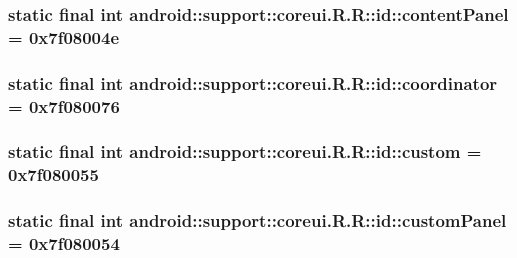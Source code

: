 \hypertarget{classandroid_1_1support_1_1coreui_1_1_r_1_1id_f7466d98502a819103a78bcd6ac69c60}{
\subsubsection[{contentPanel}]{\setlength{\rightskip}{0pt plus 5cm}static final int android::support::coreui.R.R::id::contentPanel = 0x7f08004e}}
\label{classandroid_1_1support_1_1coreui_1_1_r_1_1id_f7466d98502a819103a78bcd6ac69c60}


\hypertarget{classandroid_1_1support_1_1coreui_1_1_r_1_1id_6e4fe4e07570a40cd3118ea9df8ce334}{
\subsubsection[{coordinator}]{\setlength{\rightskip}{0pt plus 5cm}static final int android::support::coreui.R.R::id::coordinator = 0x7f080076}}
\label{classandroid_1_1support_1_1coreui_1_1_r_1_1id_6e4fe4e07570a40cd3118ea9df8ce334}


\hypertarget{classandroid_1_1support_1_1coreui_1_1_r_1_1id_7d940a399b7638fddc57ac5b88cac93d}{
\subsubsection[{custom}]{\setlength{\rightskip}{0pt plus 5cm}static final int android::support::coreui.R.R::id::custom = 0x7f080055}}
\label{classandroid_1_1support_1_1coreui_1_1_r_1_1id_7d940a399b7638fddc57ac5b88cac93d}


\hypertarget{classandroid_1_1support_1_1coreui_1_1_r_1_1id_093b1f231a42285386cf03afbac6dbeb}{
\subsubsection[{customPanel}]{\setlength{\rightskip}{0pt plus 5cm}static final int android::support::coreui.R.R::id::customPanel = 0x7f080054}}
\label{classandroid_1_1support_1_1coreui_1_1_r_1_1id_093b1f231a42285386cf03afbac6dbeb}


